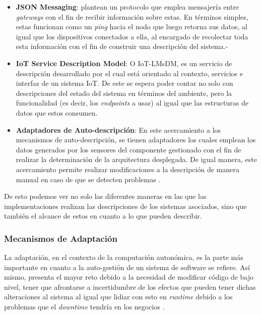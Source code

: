 \begin{itemize}
    \item \textbf{JSON Messaging}: \citeauthor{Iancu_2022} \citeyear{Iancu_2022} plantean un protocolo que emplea mensajería entre \textit{gateways} con el fin de recibir información sobre estas. En términos simples, estas funcionan como un \textit{ping} hacia el nodo que luego retorna sus datos, al igual que los dispositivos conectados a ella, al encargado de recolectar toda esta información con el fin de construir una descripción del sistema.-
    
    \item \textbf{IoT Service Description Model}: O IoT-LMsDM, es un servicio de descripción desarrollado por \citeauthor{Wang_2021} \citeyear{Wang_2021} el cual está orientado al contexto, servicios e interfaz de un sistema IoT. De este se espera poder contar no solo con descripciones del estado del sistema en términos del ambiente, pero la funcionalidad (es decir, los \textit{endpoints} a usar) al igual que las estructuras de datos que estos consumen.
    
    \item \textbf{Adaptadores de Auto-descripción}: En este acercamiento a los mecanismos de auto-descripción, se tienen adaptadores los cuales emplean los datos generados por los sensores del componente gestionado con el fin de realizar la determinación de la arquitectura desplegada. De igual manera, este acercamiento permite realizar modificaciones a la descripción de manera manual en caso de que se detecten problemas \cite{msc_henry_2022}.

\end{itemize}

De esto podemos ver no solo las diferentes maneras en las que las implementaciones realizan las descripciones de los sistemas asociados, sino que también el alcance de estos en cuanto a lo que pueden describir.

\subsubsection{Mecanismos de Adaptación}


La adaptación, en el contexto de la computación autonómica, es la parte más importante en cuanto a la auto-gestión de un sistema de software se refiere. Así mismo, presenta el mayor reto debido a la necesidad de modificar código de bajo nivel, tener que afrontarse a incertidumbre de los efectos que pueden tener dichas alteraciones al sistema al igual que lidiar con esto en \textit{runtime} debido a los problemas que el \textit{downtime} tendría en los negocios \cite{lalanda_diaconescu_mccann_2014}. 

